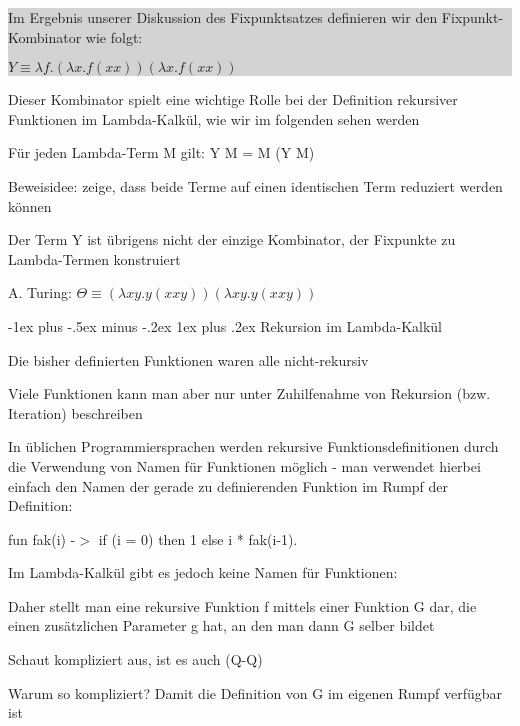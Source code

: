 \documentclass[10pt]{article}
\makeatletter
\renewcommand{\subsubsection}{\@startsection{subsubsection}{3}{0mm}%
                                {-1ex plus -.5ex minus -.2ex}%
                                {1ex plus .2ex}%
                                {\normalfont\small\bfseries}}
\makeatother
\begin{document}
\colorbox{lightgray}{
  \begin{minipage}[h]{1.0\linewidth}
    Im Ergebnis unserer Diskussion des Fixpunktsatzes definieren wir den Fixpunkt-Kombinator wie folgt: \\
    \begin{center}
      $Y \equiv \lambda f.(\lambda x.f(xx)) (\lambda x.f(xx))$
    \end{center}
  \end{minipage}
}
\begin{itemize*}
  \item Dieser Kombinator spielt eine wichtige Rolle bei der Definition rekursiver Funktionen im Lambda-Kalkül, wie wir im folgenden sehen werden
  \item Für jeden Lambda-Term M gilt: Y M = M (Y M)
  \begin{itemize*}
    \item Beweisidee: zeige, dass beide Terme auf einen identischen Term reduziert werden können
  \end{itemize*}
  \item Der Term Y ist übrigens nicht der einzige Kombinator, der Fixpunkte zu Lambda-Termen konstruiert
  \begin{itemize*}
    \item A. Turing: $\Theta \equiv (\lambda xy.y(xxy)) (\lambda xy.y(xxy))$
  \end{itemize*}
\end{itemize*}

\subsubsection{Rekursion im Lambda-Kalkül}
\begin{itemize*}
  \item Die bisher definierten Funktionen waren alle nicht-rekursiv
  \item Viele Funktionen kann man aber nur unter Zuhilfenahme von Rekursion (bzw. Iteration) beschreiben
  \item In üblichen Programmiersprachen werden rekursive Funktionsdefinitionen durch die Verwendung von Namen für Funktionen möglich - man verwendet hierbei einfach den Namen der gerade zu definierenden Funktion im Rumpf der Definition:
  \begin{itemize*}
    \item fun fak(i) -$>$ if (i = 0) then 1 else i * fak(i-1).
  \end{itemize*}
  \item Im Lambda-Kalkül gibt es jedoch keine Namen für Funktionen:
  \begin{itemize*}
    \item Daher stellt man eine rekursive Funktion f mittels einer Funktion G dar, die einen zusätzlichen Parameter g hat, an den man dann G selber bildet
    \item Schaut kompliziert aus, ist es auch (Q-Q)
    \item Warum so kompliziert? Damit die Definition von G im eigenen Rumpf verfügbar ist
    
  \end{itemize*}
\end{itemize*}
\end{document}
